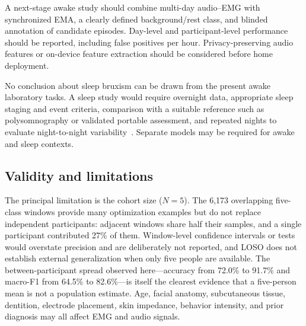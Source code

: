 \documentclass[pdflatex,sn-nature,iicol]{sn-jnl}
\begin{document}
A next-stage awake study should combine multi-day audio--EMG with synchronized EMA, a clearly defined background/rest class, and blinded annotation of candidate episodes. Day-level and participant-level performance should be reported, including false positives per hour. Privacy-preserving audio features or on-device feature extraction should be considered before home deployment.

No conclusion about sleep bruxism can be drawn from the present awake laboratory tasks. A sleep study would require overnight data, appropriate sleep staging and event criteria, comparison with a suitable reference such as polysomnography or validated portable assessment, and repeated nights to evaluate night-to-night variability~\cite{cidverdejo2024instrumental}. Separate models may be required for awake and sleep contexts.

\subsection{Validity and limitations}

The principal limitation is the cohort size ($N=5$). The 6,173 overlapping five-class windows provide many optimization examples but do not replace independent participants: adjacent windows share half their samples, and a single participant contributed 27\% of them. Window-level confidence intervals or tests would overstate precision and are deliberately not reported, and LOSO does not establish external generalization when only five people are available. The between-participant spread observed here---accuracy from 72.0\% to 91.7\% and macro-F1 from 64.5\% to 82.6\%---is itself the clearest evidence that a five-person mean is not a population estimate. Age, facial anatomy, subcutaneous tissue, dentition, electrode placement, skin impedance, behavior intensity, and prior diagnosis may all affect EMG and audio signals.
\end{document}
